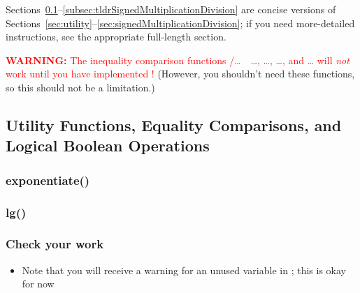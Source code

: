 Sections~\ref{subsec:tldrUtility}--\ref{subsec:tldrSignedMultiplicationDivision} are concise versions of Sections~\ref{sec:utility}--\ref{sec:signedMultiplicationDivision};
if you need more-detailed instructions, see the appropriate full-length section.

\textcolor{red}{\textbf{WARNING:} The inequality comparison functions /\dots\ \ \dots{}, \dots{}, \dots{}, and \dots{} will \textit{not} work until you have implemented !}
(However, you shouldn't need these functions, so this should not be a limitation.)

\setcounter{subsection}{3}

\subsection{Utility Functions, Equality Comparisons, and Logical Boolean Operations}\label{subsec:tldrUtility}

\begin{description}
\end{description}

\subsubsection{exponentiate()}
\begin{description}
\end{description}

\subsubsection{lg()}
\begin{description}
\end{description}

\subsubsection*{Check your work}
\begin{description}
        \begin{itemize}
            \item Note that you will receive a warning for an unused variable in ;
            this is okay for now
        \end{itemize}
    \vspace{1cm}
\end{description}

